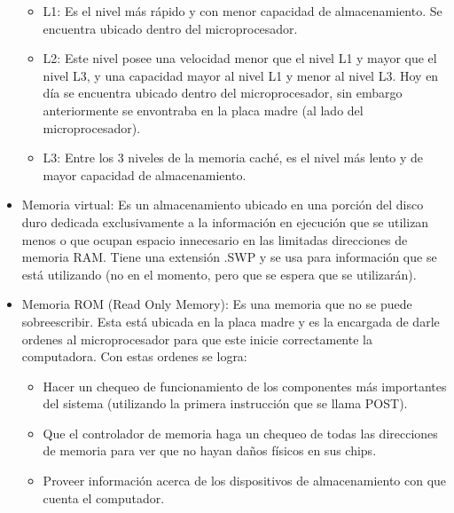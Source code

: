 \documentclass{article}
\begin{document}
\begin{itemize}
    \begin{itemize}
    
        \item L1:
        Es el nivel más rápido y con menor capacidad de almacenamiento. Se encuentra ubicado dentro del microprocesador.
        
        \item L2: 
        Este nivel posee una velocidad menor que el nivel L1 y mayor que el nivel L3, y una capacidad mayor al nivel L1 y menor al nivel L3. Hoy en día se encuentra ubicado dentro del microprocesador, sin embargo anteriormente se envontraba en la placa madre (al lado del microprocesador).
        
        \item L3:
        Entre los 3 niveles de la memoria caché, es el nivel más lento y de mayor capacidad de almacenamiento.
        
    \end{itemize}
    
    \item Memoria virtual:
    Es un almacenamiento ubicado en una porción del disco duro dedicada exclusivamente a la información en ejecución que se utilizan menos o que ocupan espacio innecesario en las limitadas direcciones de memoria RAM.
    Tiene una extensión .SWP y se usa para información que se está utilizando (no en el momento, pero que se espera que se utilizarán).

    \item Memoria ROM (Read Only Memory):
    Es una memoria que no se puede sobreescribir.
    Esta está ubicada en la placa madre y es la encargada de darle ordenes al microprocesador para que este inicie correctamente la computadora.
    Con estas ordenes se logra:
    
        \begin{itemize}
        
        \item
            Hacer un chequeo de funcionamiento de los componentes más importantes del sistema (utilizando la primera instrucción que se llama POST).
            
        \item 
            Que el controlador de memoria haga un chequeo de todas las direcciones de memoria para ver que no hayan daños físicos en sus chips.
            
        \item 
            Proveer información acerca de los dispositivos de almacenamiento con que cuenta el computador.
            

\end{itemize}
\end{itemize}
\end{document}
